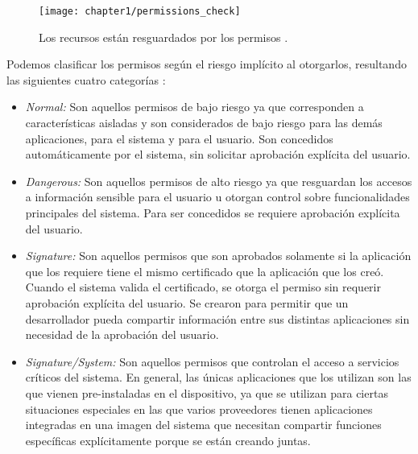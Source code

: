 \begin{figure}[hbtp]
	\begin{center}
		\texttt{[image: chapter1/permissions\_check]}
		\caption{Los recursos están resguardados por los permisos \cite{aossec}.}
		\label{fig:ch01:permissions-check}
	\end{center}
\end{figure}
Podemos clasificar los permisos según el riesgo implícito al otorgarlos, resultando las siguientes cuatro categorías \cite{Rom14}:
\begin{itemize}
    \item \emph{Normal:} Son aquellos permisos de bajo riesgo ya que corresponden a características aisladas y son considerados de bajo riesgo para las demás aplicaciones, para el sistema y para el usuario. Son concedidos automáticamente por el sistema, sin solicitar aprobación explícita del usuario.
    \item \emph{Dangerous:} Son aquellos permisos de alto riesgo ya que resguardan los accesos a información sensible para el usuario u otorgan control sobre funcionalidades principales del sistema. Para ser concedidos se requiere aprobación explícita del usuario. 
    \item \emph{Signature:} Son aquellos permisos que son aprobados solamente si la aplicación que los requiere tiene el mismo certificado que la aplicación que los creó. Cuando el sistema valida el certificado, se otorga el permiso sin requerir aprobación explícita del usuario. Se crearon para permitir que un desarrollador pueda compartir información entre sus distintas aplicaciones sin necesidad de la aprobación del usuario.
    \item \emph{Signature/System:} Son aquellos permisos que controlan el acceso a servicios críticos del sistema. En general, las únicas aplicaciones que los utilizan son las que vienen pre-instaladas en el dispositivo, ya que se utilizan para ciertas situaciones especiales en las que varios proveedores tienen aplicaciones integradas en una imagen del sistema que necesitan compartir funciones específicas explícitamente porque se están creando juntas.
\end{itemize}

